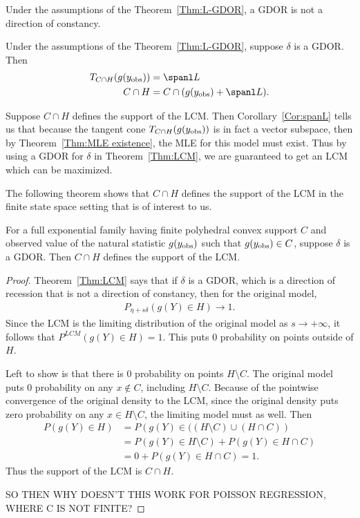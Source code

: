 \begin{corollary}
Under the assumptions of the Theorem~\ref{Thm:L-GDOR}, a GDOR is not a direction of constancy.
\end{corollary}
\begin{corollary} \label{Cor:spanL}
Under the assumptions of the Theorem~\ref{Thm:L-GDOR}, suppose $\delta$ is a GDOR.  Then
\begin{align*}
	T_{C \cap H} (g(\yobs)) &= \spanl L \\
	C \cap H &= C \cap (g(\yobs) + \spanl L ). \\
\end{align*}
\end{corollary}

Suppose $C \cap H$ defines the support of the LCM.  Then Corollary~\ref{Cor:spanL} tells
us that because the tangent cone $T_{C \cap H} (g(y_{\textrm{obs}}))$ is in fact a vector subspace, 
then by Theorem~\ref{Thm:MLE existence}, the MLE for this model must exist.
Thus by using a GDOR for $\delta$ in Theorem~\ref{Thm:LCM}, we are guaranteed to get an LCM
which can be maximized.

The following theorem shows that $C \cap H$ defines the support of the LCM in the finite
state space setting that is of interest to us.
\begin{theorem}
For a full exponential family having finite polyhedral convex support $C$ and observed value 
of the natural statistic $g(y_{\textrm{obs}})$ such that $g(y_{\textrm{obs}}) \in C$, suppose $\delta$ is a GDOR.
Then $C \cap H$ defines the support of the LCM.
\end{theorem}
\begin{proof}
Theorem~\ref{Thm:LCM} says that if $\delta$ is a GDOR, which is a direction of recession
that is not a direction of constancy, then for the original model,
\begin{align*}
	P_{\eta+s\delta}( g(Y) \in H ) \to 1.
\end{align*}
Since the LCM is the limiting distribution of the original model as $s \to +\infty$, it follows that $P^{LCM}(g(Y) \in H) = 1$.  
This puts 0 probability on points outside of $H$.  

Left to show is that there is 0 probability on points $H \setminus C$.
The original model puts 0 probability on any $x \notin C$, including $H \setminus C$.  Because of the pointwise convergence of the original density to the LCM, since the original density puts zero probability on any $x \in H \setminus C$, the limiting model must as well.  Then
\begin{align*}
	P(g(Y) \in H) &= P \left( g(Y) \in ( (H \setminus C)  \cup (H \cap C)   \right ) \\
	 			&= P \left( g(Y) \in H \setminus C \right) 
								+ P \left( g(Y) \in H \cap C \right ) \\
	 			&= 0 + P \left( g(Y) \in H \cap C  \right ) = 1.
\end{align*}
Thus the support of the LCM is $C \cap H$.

SO THEN WHY DOESN'T THIS WORK FOR POISSON REGRESSION, WHERE C IS NOT FINITE?
\end{proof}


